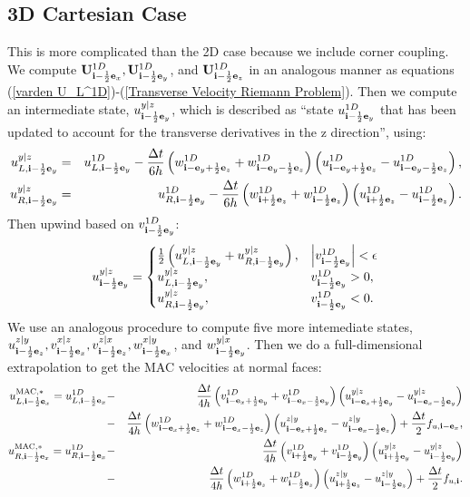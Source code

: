 \subsection{3D Cartesian Case}
This is more complicated than the 2D case because we include corner
coupling.  We compute ${\bf U}_{{\bf i}-\frac{1}{2}{\bf e}_x}^{1D},
{\bf U}_{{\bf i}-\frac{1}{2}{\bf e}_y}^{1D}$, and ${\bf U}_{{\bf i}-\frac{1}{2}{\bf e}_z}^{1D}$ in an
analogous manner as equations (\ref{varden U_L^1D})-(\ref{Transverse
  Velocity Riemann Problem}).  Then we compute an intermediate state,
$u_{{\bf i}-\frac{1}{2}{\bf e}_y}^{y|z}$, which is described as ``state
$u_{{\bf i}-\frac{1}{2}{\bf e}_y}^{1D}$ that has been updated to account for the
transverse derivatives in the z direction'', using:
\begin{eqnarray}
u_{L,{\bf i}-\frac{1}{2}{\bf e}_y}^{y|z} &=& u_{L,{\bf i}-\frac{1}{2}{\bf e}_y}^{1D} - \frac{\Delta t}{6h}\left(w_{{\bf i}-{\bf e}_y+\frac{1}{2}{\bf e}_z}^{1D}+w_{{\bf i}-{\bf e}_y-\frac{1}{2}{\bf e}_z}^{1D}\right)\left(u_{{\bf i}-{\bf e}_y+\frac{1}{2}{\bf e}_z}^{1D}-u_{{\bf i}-{\bf e}_y-\frac{1}{2}{\bf e}_z}^{1D}\right), \\
u_{R,{\bf i}-\frac{1}{2}{\bf e}_y}^{y|z} &=& u_{R,{\bf i}-\frac{1}{2}{\bf e}_y}^{1D} - \frac{\Delta t}{6h}\left(w_{{\bf i}+\frac{1}{2}{\bf e}_z}^{1D}+w_{{\bf i}-\frac{1}{2}{\bf e}_z}^{1D}\right)\left(u_{{\bf i}+\frac{1}{2}{\bf e}_z}^{1D}-u_{{\bf i}-\frac{1}{2}{\bf e}_z}^{1D}\right).
\end{eqnarray}
Then upwind based on $v_{{\bf i}-\frac{1}{2}{\bf e}_y}^{1D}$:
\begin{equation}
u_{{\bf i}-\frac{1}{2}{\bf e}_y}^{y|z} =
\begin{cases}
\frac{1}{2}\left(u_{L,{\bf i}-\frac{1}{2}{\bf e}_y}^{y|z} + u_{R,{\bf i}-\frac{1}{2}{\bf e}_y}^{y|z}\right), & \left|v_{{\bf i}-\frac{1}{2}{\bf e}_y}^{1D}\right| < \epsilon \\
u_{L,{\bf i}-\frac{1}{2}{\bf e}_y}^{y|z}, & v_{{\bf i}-\frac{1}{2}{\bf e}_y}^{1D} > 0, \\
u_{R,{\bf i}-\frac{1}{2}{\bf e}_y}^{y|z}, & v_{{\bf i}-\frac{1}{2}{\bf e}_y}^{1D} < 0.
\end{cases}
\end{equation}
We use an analogous procedure to compute five more intemediate states,
$u_{{\bf i}-\frac{1}{2}{\bf e}_z}^{z|y}, v_{{\bf i}-\frac{1}{2}{\bf e}_x}^{x|z},
v_{{\bf i}-\frac{1}{2}{\bf e}_z}^{z|x}, w_{{\bf i}-\frac{1}{2}{\bf e}_x}^{x|y}$, and
$w_{{\bf i}-\frac{1}{2}{\bf e}_y}^{y|x}$.  Then we do a full-dimensional
extrapolation to get the MAC velocities at normal faces:
\begin{eqnarray}
u_{L,{\bf i}-\frac{1}{2}{\bf e}_x}^{\rm MAC,*} = u_{L,{\bf i}-\frac{1}{2}{\bf e}_x}^{1D} &-& \frac{\Delta t}{4h}\left(v_{{\bf i}-{\bf e}_x+\frac{1}{2}{\bf e}_y}^{1D}+v_{{\bf i}-{\bf e}_x-\frac{1}{2}{\bf e}_y}^{1D}\right)\left(u_{{\bf i}-{\bf e}_x+\frac{1}{2}{\bf e}_y}^{y|z}-u_{{\bf i}-{\bf e}_x-\frac{1}{2}{\bf e}_y}^{y|z}\right) \nonumber \\
&-& \frac{\Delta t}{4h}\left(w_{{\bf i}-{\bf e}_x+\frac{1}{2}{\bf e}_z}^{1D}+w_{{\bf i}-{\bf e}_x-\frac{1}{2}{\bf e}_z}^{1D}\right)\left(u_{{\bf i}-{\bf e}_x+\frac{1}{2}{\bf e}_z}^{z|y}-u_{{\bf i}-{\bf e}_x-\frac{1}{2}{\bf e}_z}^{z|y}\right) + \frac{\Delta t}{2}f_{u,{\bf i}-{\bf e}_x}, \\
u_{R,{\bf i}-\frac{1}{2}{\bf e}_x}^{\rm MAC,*} = u_{R,{\bf i}-\frac{1}{2}{\bf e}_x}^{1D} &-& \frac{\Delta t}{4h}\left(v_{{\bf i}+\frac{1}{2}{\bf e}_y}^{1D}+v_{{\bf i}-\frac{1}{2}{\bf e}_y}^{1D}\right)\left(u_{{\bf i}+\frac{1}{2}{\bf e}_y}^{y|z}-u_{{\bf i}-\frac{1}{2}{\bf e}_y}^{y|z}\right) \nonumber \\
&-& \frac{\Delta t}{4h}\left(w_{{\bf i}+\frac{1}{2}{\bf e}_z}^{1D}+w_{{\bf i}-\frac{1}{2}{\bf e}_z}^{1D}\right)\left(u_{{\bf i}+\frac{1}{2}{\bf e}_z}^{z|y}-u_{{\bf i}-\frac{1}{2}{\bf e}_z}^{z|y}\right) + \frac{\Delta t}{2}f_{u,{\bf i}}.
\end{eqnarray}
